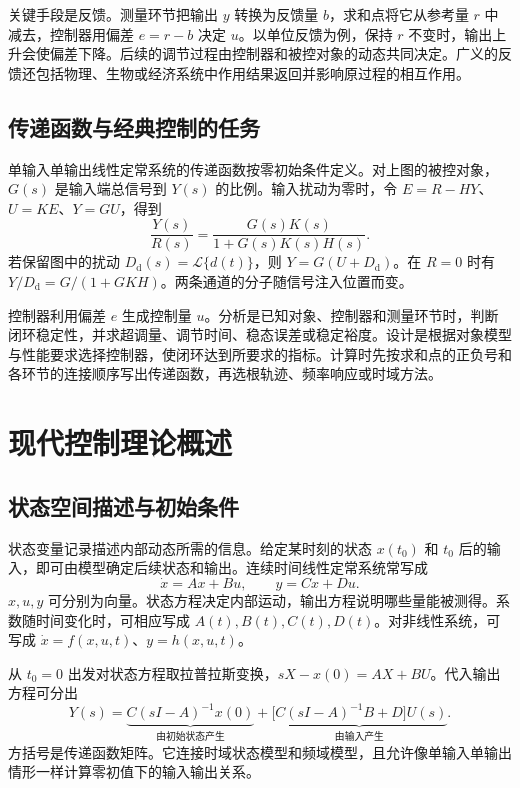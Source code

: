 \sol 关键手段是反馈。测量环节把输出 $y$ 转换为反馈量 $b$，求和点将它从参考量 $r$ 中减去，控制器用偏差 $e=r-b$ 决定 $u$。以单位反馈为例，保持 $r$ 不变时，输出上升会使偏差下降。后续的调节过程由控制器和被控对象的动态共同决定。广义的反馈还包括物理、生物或经济系统中作用结果返回并影响原过程的相互作用。

\subsection{传递函数与经典控制的任务}

单输入单输出线性定常系统的传递函数按零初始条件定义。对上图的被控对象，$G(s)$ 是输入端总信号到 $Y(s)$ 的比例。输入扰动为零时，令 $E=R-HY$、$U=KE$、$Y=GU$，得到
\[
    \frac{Y(s)}{R(s)}=\frac{G(s)K(s)}{1+G(s)K(s)H(s)} .
\]
若保留图中的扰动 $D_{\mathrm d}(s)=\mathcal L\{d(t)\}$，则 $Y=G(U+D_{\mathrm d})$。在 $R=0$ 时有 $Y/D_{\mathrm d}=G/(1+GKH)$。两条通道的分子随信号注入位置而变。



\sol 控制器利用偏差 $e$ 生成控制量 $u$。分析是已知对象、控制器和测量环节时，判断闭环稳定性，并求超调量、调节时间、稳态误差或稳定裕度。设计是根据对象模型与性能要求选择控制器，使闭环达到所要求的指标。计算时先按求和点的正负号和各环节的连接顺序写出传递函数，再选根轨迹、频率响应或时域方法。

\section{现代控制理论概述}

\subsection{状态空间描述与初始条件}

状态变量记录描述内部动态所需的信息。给定某时刻的状态 $x(t_0)$ 和 $t_0$ 后的输入，即可由模型确定后续状态和输出。连续时间线性定常系统常写成
\[
    \dot x=Ax+Bu,\qquad y=Cx+Du.
\]
$x,u,y$ 可分别为向量。状态方程决定内部运动，输出方程说明哪些量能被测得。系数随时间变化时，可相应写成 $A(t),B(t),C(t),D(t)$。对非线性系统，可写成 $\dot x=f(x,u,t)$、$y=h(x,u,t)$。

从 $t_0=0$ 出发对状态方程取拉普拉斯变换，$sX-x(0)=AX+BU$。代入输出方程可分出
\[
    Y(s)=
    \underbrace{C(sI-A)^{-1}x(0)}_{\text{由初始状态产生}}
    +\underbrace{\bigl[C(sI-A)^{-1}B+D\bigr]U(s)}_{\text{由输入产生}}.
\]
方括号是传递函数矩阵。它连接时域状态模型和频域模型，且允许像单输入单输出情形一样计算零初值下的输入输出关系。

